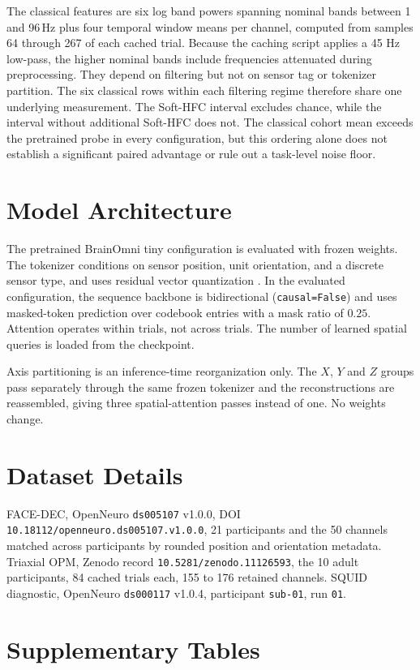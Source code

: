 The classical features are six log band powers spanning nominal bands between 1 and 96\,Hz plus four temporal window means per channel, computed from samples 64 through 267 of each cached trial. Because the caching script applies a 45 Hz low-pass, the higher nominal bands include frequencies attenuated during preprocessing. They depend on filtering but not on sensor tag or tokenizer partition. The six classical rows within each filtering regime therefore share one underlying measurement. The Soft-HFC interval excludes chance, while the interval without additional Soft-HFC does not. The classical cohort mean exceeds the pretrained probe in every configuration, but this ordering alone does not establish a significant paired advantage or rule out a task-level noise floor.

\section{Model Architecture}

The pretrained BrainOmni tiny configuration is evaluated with frozen weights.
The tokenizer conditions on sensor position, unit orientation, and a discrete
sensor type, and uses residual vector quantization \citep{xiao2025brainomni}. In the evaluated configuration, the sequence backbone is
bidirectional (\texttt{causal=False}) and uses masked-token prediction over
codebook entries with a mask ratio of $0.25$. Attention operates within trials,
not across trials. The number of learned spatial queries is loaded from the
checkpoint.

\noindent
Axis partitioning is an inference-time reorganization only. The $X$, $Y$ and $Z$ groups
pass separately through the same frozen tokenizer and the reconstructions are
reassembled, giving three spatial-attention passes instead of one. No weights change.

\section{Dataset Details}\label{sec:datasets}
FACE-DEC, OpenNeuro \texttt{ds005107} v1.0.0, DOI \texttt{10.18112/openneuro.ds005107.v1.0.0},
21 participants and the 50 channels matched across participants by rounded position and
orientation metadata. Triaxial OPM, Zenodo record \texttt{10.5281/zenodo.11126593}, the
10 adult participants, 84 cached trials each, 155 to 176 retained channels. SQUID diagnostic,
OpenNeuro \texttt{ds000117} v1.0.4, participant \texttt{sub-01}, run \texttt{01}.


\section{Supplementary Tables}

